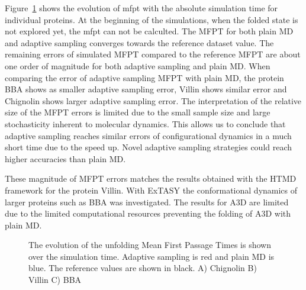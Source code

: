 Figure~\ref{fig:mfpt} shows the evolution of mfpt with the absolute simulation time for individual proteins. At the beginning of the simulations, when the folded state is not explored yet, the mfpt can not be calculted. The MFPT for both plain MD and adaptive sampling converges towards the reference dataset value. The remaining errors of simulated MFPT compared to the reference MFPT are about one order of magnitude for both adaptive sampling and plain MD. When comparing the error of adaptive sampling MFPT with plain MD, the protein BBA shows as smaller adaptive sampling error, Villin shows similar error and Chignolin shows larger adaptive sampling error. The interpretation of the relative size of the MFPT errors is limited due to the small sample size and large stochasticity inherent to molecular dynamics. This allows us to conclude that adaptive sampling reaches similar errors of configurational dynamics in a much short time due to the speed up. Novel adaptive sampling strategies could reach higher accuracies than plain MD. 


These magnitude of MFPT errors matches the results obtained with the HTMD framework \cite{doerr2016htmd} for the protein Villin. With ExTASY the conformational dynamics of larger proteins such as BBA was investigated. The results for A3D are limited due to the limited computational resources preventing the folding of A3D with plain MD.  
\begin{figure}[H]
\centering
   \begin{subfigure}[b]{0.5\linewidth}
   {}
   \end{subfigure}%
   
   \begin{subfigure}[b]{0.5\linewidth}
   {}
   \end{subfigure}%
   
   \begin{subfigure}[b]{0.5\linewidth}
   {}
    \end{subfigure}%
  \caption{
  The evolution of the unfolding Mean First Passage Times is shown over the simulation time. Adaptive sampling is red and plain MD is blue. The reference values are shown in black.
  A) Chignolin B) Villin C) BBA } 
  \label{fig:mfpt}
\end{figure}


